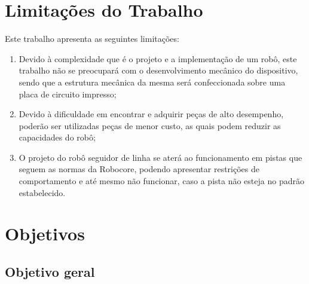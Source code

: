 \section{Limitações do Trabalho}\label{limitacoes}





 
Este trabalho apresenta as seguintes limitações:
\begin{enumerate}
 \item Devido à complexidade que é o projeto e a implementação de um robô, este trabalho não se preocupará com 
 o desenvolvimento mecânico do dispositivo, sendo que a estrutura mecânica da mesma será confeccionada 
 sobre uma placa de circuito  impresso;
  \item Devido à dificuldade em encontrar e adquirir peças de alto desempenho, poderão ser utilizadas peças de menor custo, 
  as  quais podem reduzir as capacidades do robô;
 \item O projeto do robô seguidor de linha se aterá ao funcionamento em pistas que seguem as normas da Robocore, podendo 
 apresentar restrições de comportamento e até mesmo não funcionar, caso a pista não esteja no padrão estabelecido. 
\end{enumerate}


\begin{spacing}{2}\end{spacing}
\section{Objetivos}\label{objetivos}


\begin{spacing}{2}\end{spacing}
\subsection{Objetivo geral}

